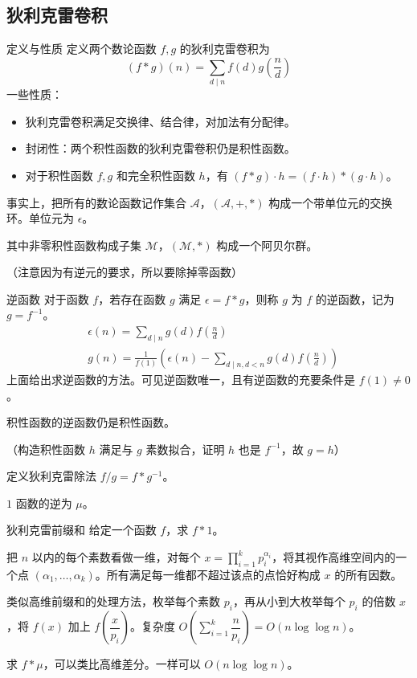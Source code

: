 \documentclass [hyperref={bookmarksdepth=4}, aspectratio=169] {beamer}
\theoremstyle {fy}
\begin{document}
\subsection{狄利克雷卷积}

\begin{frame}{定义与性质}
定义两个数论函数 $f,g$ 的狄利克雷卷积为
$$
(f*g)(n)=\sum_{d\mid n}f(d)g(\frac{n}{d})
$$
一些性质：

\begin{itemize}
    \item 狄利克雷卷积满足交换律、结合律，对加法有分配律。
    \item 封闭性：两个积性函数的狄利克雷卷积仍是积性函数。
    \item 对于积性函数 $f,g$ 和完全积性函数 $h$，有 $(f*g)\cdot h=(f\cdot h)*(g\cdot h)$。
\end{itemize}

事实上，把所有的数论函数记作集合 $\mathcal{A}$，$(\mathcal{A},+,*)$ 构成一个带单位元的交换环。单位元为 $\epsilon$。

其中非零积性函数构成子集 $\mathcal{M}$，$(\mathcal{M},*)$ 构成一个阿贝尔群。

（注意因为有逆元的要求，所以要除掉零函数）
\end{frame}

\begin{frame}{逆函数}
对于函数 $f$，若存在函数 $g$ 满足 $\epsilon=f*g$，则称 $g$ 为 $f$ 的逆函数，记为 $g=f^{-1}$。
$$
\begin{aligned}
&\epsilon(n)=\sum_{d\mid n}g(d)f(\frac{n}{d})\\
&g(n)=\frac{1}{f(1)}(\epsilon(n)-\sum_{d\mid n,d<n}g(d)f(\frac{n}{d}))
\end{aligned}
$$
上面给出求逆函数的方法。可见逆函数唯一，且有逆函数的充要条件是 $f(1)\neq 0$。

积性函数的逆函数仍是积性函数。

（构造积性函数 $h$ 满足与 $g$ 素数拟合，证明 $h$ 也是 $f^{-1}$，故 $g=h$）

定义狄利克雷除法 $f/g=f*g^{-1}$。

$1$ 函数的逆为 $\mu$。
\end{frame}

\begin{frame}{狄利克雷前缀和}
给定一个函数 $f$，求 $f*1$。

把 $n$ 以内的每个素数看做一维，对每个 $x=\prod\limits_{i=1}^kp_i^{\alpha_i}$，将其视作高维空间内的一个点 $(\alpha_1,\dots,\alpha_k)$。所有满足每一维都不超过该点的点恰好构成 $x$ 的所有因数。

类似高维前缀和的处理方法，枚举每个素数 $p_i$，再从小到大枚举每个 $p_i$ 的倍数 $x$，将 $f(x)$ 加上 $f(\dfrac{x}{p_i})$。复杂度 $O(\sum\limits_{i=1}^k\dfrac{n}{p_i})=O(n\log\log n)$。

求 $f*\mu$，可以类比高维差分。一样可以 $O(n\log\log n)$。
\end{frame}
\end{document}
